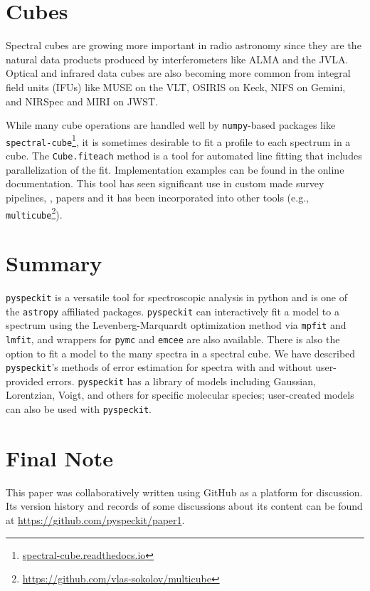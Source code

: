 \documentclass[twocolumn]{aastex62}
\newcommand{\pyspeckit}{\texttt{pyspeckit}\xspace}
\newcommand{\astropy}{\texttt{astropy}\xspace}
\begin{document}
\section{Cubes}
\label{sec:cubes}
Spectral cubes are growing more important in radio astronomy since they are the
natural data products produced by interferometers like ALMA and the JVLA.
Optical and infrared data cubes are also becoming
more common from integral field units (IFUs) like MUSE on
the VLT, OSIRIS on Keck, NIFS on Gemini, and NIRSpec and MIRI on JWST.

While many cube operations are handled well by \texttt{numpy}-based packages
like \texttt{spectral-cube}\footnote{\url{spectral-cube.readthedocs.io}},
it is sometimes desirable to fit a profile to each spectrum
in a cube.  The \texttt{Cube.fiteach} method is a tool for automated line
fitting that includes parallelization of the fit. Implementation examples can be
found in the online documentation.
This tool  has  seen significant use in
custom made survey pipelines,
\citep[e.g.][\url{https://github.com/GBTAmmoniaSurvey/GAS}]{Friesen2017-GAS},
papers and it has been incorporated into other tools (e.g.,
\texttt{multicube}\footnote{\url{https://github.com/vlas-sokolov/multicube}}).


\section{Summary}
\texttt{pyspeckit} is a versatile tool for spectroscopic analysis in python and
is one of the \astropy affiliated packages. \pyspeckit can interactively fit a
model to a spectrum using the Levenberg-Marquardt optimization method via
\texttt{mpfit} and \texttt{lmfit}, and wrappers for \texttt{pymc} and
\texttt{emcee} are also available.  There is also the option to fit a model to
the many spectra in a spectral cube. We have described \pyspeckit's methods of
error estimation for spectra with and without user-provided errors. \pyspeckit
has a library of models including Gaussian, Lorentzian, Voigt, and others for
specific molecular species; user-created models can also be used with
\pyspeckit.

\section{Final Note}
This paper was collaboratively written using GitHub as a platform for
discussion.  Its version history and records of some discussions about its
content can be found at \url{https://github.com/pyspeckit/paper1}.
\end{document}

